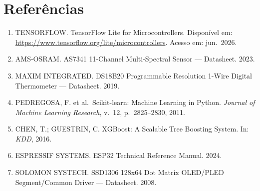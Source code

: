 \documentclass[12pt, a4paper]{article}
\begin{document}
\section{Refer\^{e}ncias}

\begin{enumerate}
  \item TENSORFLOW. TensorFlow Lite for Microcontrollers. Dispon\'{i}vel em: \url{https://www.tensorflow.org/lite/microcontrollers}. Acesso em: jun.\ 2026.
  \item AMS-OSRAM. AS7341 11-Channel Multi-Spectral Sensor --- Datasheet. 2023.
  \item MAXIM INTEGRATED. DS18B20 Programmable Resolution 1-Wire Digital Thermometer --- Datasheet. 2019.
  \item PEDREGOSA, F. et al.\ Scikit-learn: Machine Learning in Python. \textit{Journal of Machine Learning Research}, v.\ 12, p.\ 2825--2830, 2011.
  \item CHEN, T.; GUESTRIN, C. XGBoost: A Scalable Tree Boosting System. In: \textit{KDD}, 2016.
  \item ESPRESSIF SYSTEMS. ESP32 Technical Reference Manual. 2024.
  \item SOLOMON SYSTECH. SSD1306 128x64 Dot Matrix OLED/PLED Segment/Common Driver --- Datasheet. 2008.
\end{enumerate}
\end{document}
